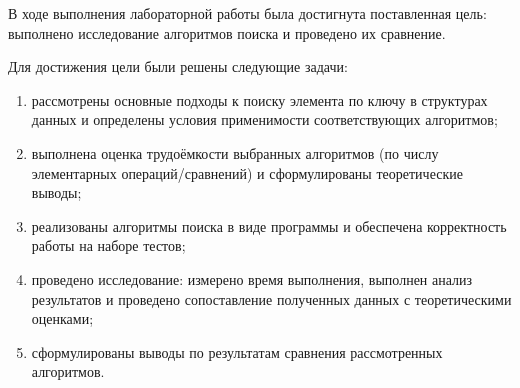 
В ходе выполнения лабораторной работы была достигнута поставленная цель: выполнено исследование алгоритмов поиска и проведено их сравнение.

Для достижения цели были решены следующие задачи:
\begin{enumerate}
	\item рассмотрены основные подходы к поиску элемента по ключу в структурах данных и определены условия применимости соответствующих алгоритмов;
	\item выполнена оценка трудоёмкости выбранных алгоритмов (по числу элементарных операций/сравнений) и сформулированы теоретические выводы;
	\item реализованы алгоритмы поиска в виде программы и обеспечена корректность работы на наборе тестов;
	\item проведено исследование: измерено время выполнения, выполнен анализ результатов и проведено сопоставление полученных данных с теоретическими оценками;
	\item сформулированы выводы по результатам сравнения рассмотренных алгоритмов.
\end{enumerate}
